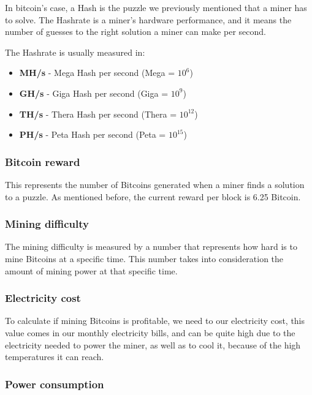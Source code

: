 \documentclass{article}
\newcommand\tab[1][1cm]{\hspace*{#1}}
\begin{document}
\tab In bitcoin's case, a Hash is the puzzle we previously mentioned that a miner has to solve. The Hashrate is a miner's hardware performance, and it means the number of guesses to the right solution a miner can make per second.

The Hashrate is usually measured in:

\begin{itemize}
 \item \textbf{MH/s} - Mega Hash per second (Mega = \(10^6\))
 \item \textbf{GH/s} - Giga Hash per second (Giga = \(10^9\))
 \item \textbf{TH/s} - Thera Hash per second (Thera = \(10^{12}\))
 \item \textbf{PH/s} - Peta Hash per second (Peta = \(10^{15}\))
\end{itemize}

\subsubsection{Bitcoin reward}

\tab This represents the number of Bitcoins generated when a miner finds a solution to a puzzle. As mentioned before, the current reward per block is 6.25 Bitcoin.

\subsubsection{Mining difficulty}

\tab The mining difficulty is measured by a number that represents how hard is to mine Bitcoins at a specific time. This number takes into consideration the amount of mining power at that specific time.

\subsubsection{Electricity cost}

\tab To calculate if mining Bitcoins is profitable, we need to our electricity cost, this value comes in our monthly electricity bills, and can be quite high due to the electricity needed to power the miner, as well as to cool it, because of the high temperatures it can reach.

\subsubsection{Power consumption}
\end{document}
